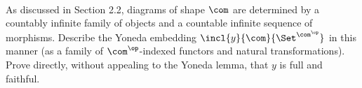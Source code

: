 \documentclass[main.tex]{subfiles}
\begin{document}
\maketitle

\paragraph{}
\begin{exercise}
	As discussed in Section 2.2, diagrams of shape \(\com\) are determined
	by a countably infinite family of objects and a countable infinite sequence
	of morphisms. Describe the Yoneda embedding
	\(\incl{y}{\com}{\Set^{\com^\op}}\) in this manner (as a family of
	\(\com^\op\)-indexed functors and natural transformations). Prove
	directly, without appealing to the Yoneda lemma, that \(y\) is full and
	faithful.
\end{exercise}
\end{document}
